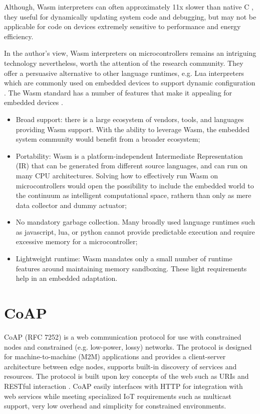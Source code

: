 Although, Wasm interpreters can often approximately 11x slower than native C \cite{wasm3-performance}, they useful for dynamically updating system code and debugging, but may not be applicable for code on devices extremely sensitive to performance and energy efficiency. 

In the author's view, Wasm interpreters on microcontrollers remains an intriguing technology nevertheless, worth the attention of the research community. They offer a persuasive alternative to other language runtimes, e.g. Lua interpreters which are commonly used on embedded devices to support dynamic configuration \cite{levee}. The Wasm standard has a number of features that make it appealing for embedded devices \cite{ewasm}.

\begin{itemize}
    \item Broad support: there is a large ecosystem of vendors, tools, and languages providing Wasm support. With the ability to leverage Wasm, the embedded system community would benefit from a broader ecosystem;
    \item Portability: Wasm is a platform-independent Intermediate Representation (IR) that can be generated from different source languages, and can run on many CPU architectures. Solving how to effectively run Wasm on microcontrollers would open the possibility to include the embedded world to the continuum as intelligent computational space, rathern than only as mere data collector and dummy actuator;
    \item No mandatory garbage collection. Many broadly used language runtimes such as javascript, lua, or python cannot provide predictable execution and require excessive memory for a microcontroller;
    \item Lightweight runtime: Wasm mandates only a small number of runtime features around maintaining memory sandboxing. These light requirements help in an embedded adaptation.
\end{itemize}

\section{CoAP}
\label{sec:coap}

CoAP \cite{coap} (RFC 7252) is a web communication protocol for use with constrained nodes and constrained (e.g. low-power, lossy) networks. The protocol is designed for machine-to-machine (M2M) applications and provides a client-server architecture between edge nodes, supports built-in discovery of services and resources. The protocol is built upon key concepts of the web such as URIs and RESTful interaction \cite{coap-soa}. CoAP easily interfaces with HTTP for integration with web services while meeting specialized IoT requirements such as multicast support, very low overhead and simplicity for constrained environments. 

